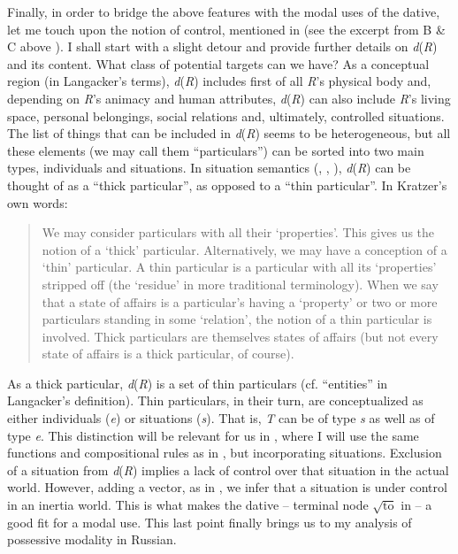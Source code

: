 \documentclass[output=paper,colorlinks,citecolor=brown,modfonts,nonflat]{langsci/langscibook}
\begin{document}
Finally, in order to bridge the above features with the modal uses of the dative, let me touch upon the notion of control, mentioned in  (see the excerpt from B \& C above ). I shall start with a slight detour and provide further details on \textit{d}(\textit{R}) and its content. What class of potential targets can we have? As a conceptual region (in Langacker’s terms), \textit{d}(\textit{R}) includes first of all \textit{R}’s physical body and, depending on \textit{R}’s animacy and human attributes, \textit{d}(\textit{R}) can also include \textit{R}’s living space, personal belongings, social relations and, ultimately, controlled situations. The list of things that can be included in \textit{d}(\textit{R}) seems to be heterogeneous, but all these elements (we may call them “particulars”) can be sorted into two main types, individuals and situations. In situation semantics (\citealt{Kratzer1989}, \citeyear{Kratzer2002}, \citeyear{Kratzer2019}), \textit{d}(\textit{R}) can be thought of as a “thick particular”, as opposed to a “thin particular”. In Kratzer’s own words: 
\begin{quote}
We may consider particulars with all their ‘properties’. This gives us the notion of a ‘thick’ particular. Alternatively, we may have a conception of a ‘thin’ particular. A thin particular is a particular with all its ‘properties’ stripped off (the ‘residue’ in more traditional terminology). When we say that a state of affairs is a particular’s having a ‘property’ or two or more particulars standing in some ‘relation’, the notion of a thin particular is involved. Thick particulars are themselves states of affairs (but not every state of affairs is a thick particular, of course). \hfill \citep[613]{Kratzer1989} 
\end{quote}

As a thick particular, \textit{d}(\textit{R}) is a set of thin particulars (cf. “entities” in Langacker’s definition). Thin particulars, in their turn, are conceptualized as either individuals (\textit{e}) or situations (\textit{s}). That is, \textit{T} can be of type \textit{s} as well as of type \textit{e}. This distinction will be relevant for us in , where I will use the same functions and compositional rules as in , but incorporating situations. Exclusion of a situation from \textit{d}(\textit{R}) implies a lack of control over that situation in the actual world. However, adding a vector, as in , we infer that a situation is under control in an inertia world. This is what makes the dative – terminal node  $\sqrt{\text{to}}$  in  – a good fit for a modal use. This last point finally brings us to my analysis of possessive modality in Russian.
\end{document}
